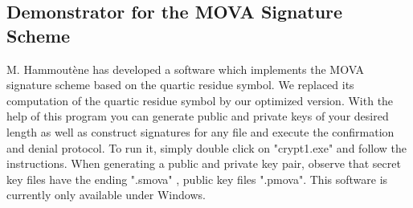 \documentclass[a4paper, 11pt]{article}
\begin{document}
 
 \subsection{Demonstrator for the MOVA Signature Scheme} 
 M. Hammout\`ene has developed a software which implements the MOVA signature scheme based on the quartic residue symbol. We replaced its computation of the quartic residue symbol by our optimized version. With the help of this program you can generate public and private keys of your desired length as well as construct signatures for any file and execute the confirmation and denial protocol. To run it, simply double click on "crypt1.exe" and follow the instructions. When generating a public and private key pair, observe that secret key files have the ending ".smova" , public key files ".pmova". This software is currently only available under Windows. 
 
 
 
\end{document}
